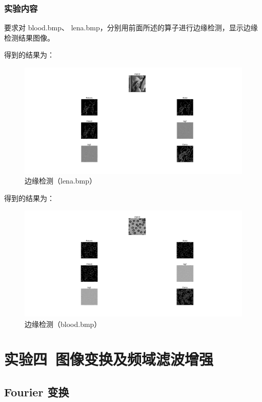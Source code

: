 \documentclass{ctexart}
\begin{document}
\subsubsection{\hei 实验内容}
要求对 blood.bmp、 lena.bmp，分别用前面所述的算子进行边缘检测，显示边缘
检测结果图像。
\par 得到的结果为：
\begin{figure}[H]
    \centering
    \includegraphics[scale=0.35]{lena.png}
    \caption{边缘检测（lena.bmp）}
\end{figure}
\par 得到的结果为：
\begin{figure}[H]
    \centering
    \includegraphics[scale=0.35]{blood.png}
    \caption{边缘检测（blood.bmp）}
\end{figure}
\section{\hei 实验四\ 图像变换及频域滤波增强}
\subsection{\hei Fourier 变换}
\end{document}
